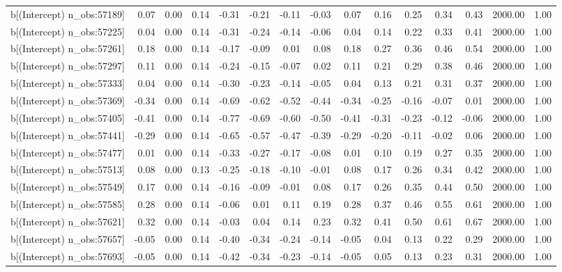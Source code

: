 \begin{table}[ht]
\begin{tabular}{rrrrrrrrrrrrrrr}
  b[(Intercept) n\_obs:57189] & 0.07 & 0.00 & 0.14 & -0.31 & -0.21 & -0.11 & -0.03 & 0.07 & 0.16 & 0.25 & 0.34 & 0.43 & 2000.00 & 1.00 \\ 
  b[(Intercept) n\_obs:57225] & 0.04 & 0.00 & 0.14 & -0.31 & -0.24 & -0.14 & -0.06 & 0.04 & 0.14 & 0.22 & 0.33 & 0.41 & 2000.00 & 1.00 \\ 
  b[(Intercept) n\_obs:57261] & 0.18 & 0.00 & 0.14 & -0.17 & -0.09 & 0.01 & 0.08 & 0.18 & 0.27 & 0.36 & 0.46 & 0.54 & 2000.00 & 1.00 \\ 
  b[(Intercept) n\_obs:57297] & 0.11 & 0.00 & 0.14 & -0.24 & -0.15 & -0.07 & 0.02 & 0.11 & 0.21 & 0.29 & 0.38 & 0.46 & 2000.00 & 1.00 \\ 
  b[(Intercept) n\_obs:57333] & 0.04 & 0.00 & 0.14 & -0.30 & -0.23 & -0.14 & -0.05 & 0.04 & 0.13 & 0.21 & 0.31 & 0.37 & 2000.00 & 1.00 \\ 
  b[(Intercept) n\_obs:57369] & -0.34 & 0.00 & 0.14 & -0.69 & -0.62 & -0.52 & -0.44 & -0.34 & -0.25 & -0.16 & -0.07 & 0.01 & 2000.00 & 1.00 \\ 
  b[(Intercept) n\_obs:57405] & -0.41 & 0.00 & 0.14 & -0.77 & -0.69 & -0.60 & -0.50 & -0.41 & -0.31 & -0.23 & -0.12 & -0.06 & 2000.00 & 1.00 \\ 
  b[(Intercept) n\_obs:57441] & -0.29 & 0.00 & 0.14 & -0.65 & -0.57 & -0.47 & -0.39 & -0.29 & -0.20 & -0.11 & -0.02 & 0.06 & 2000.00 & 1.00 \\ 
  b[(Intercept) n\_obs:57477] & 0.01 & 0.00 & 0.14 & -0.33 & -0.27 & -0.17 & -0.08 & 0.01 & 0.10 & 0.19 & 0.27 & 0.35 & 2000.00 & 1.00 \\ 
  b[(Intercept) n\_obs:57513] & 0.08 & 0.00 & 0.13 & -0.25 & -0.18 & -0.10 & -0.01 & 0.08 & 0.17 & 0.26 & 0.34 & 0.42 & 2000.00 & 1.00 \\ 
  b[(Intercept) n\_obs:57549] & 0.17 & 0.00 & 0.14 & -0.16 & -0.09 & -0.01 & 0.08 & 0.17 & 0.26 & 0.35 & 0.44 & 0.50 & 2000.00 & 1.00 \\ 
  b[(Intercept) n\_obs:57585] & 0.28 & 0.00 & 0.14 & -0.06 & 0.01 & 0.11 & 0.19 & 0.28 & 0.37 & 0.46 & 0.55 & 0.61 & 2000.00 & 1.00 \\ 
  b[(Intercept) n\_obs:57621] & 0.32 & 0.00 & 0.14 & -0.03 & 0.04 & 0.14 & 0.23 & 0.32 & 0.41 & 0.50 & 0.61 & 0.67 & 2000.00 & 1.00 \\ 
  b[(Intercept) n\_obs:57657] & -0.05 & 0.00 & 0.14 & -0.40 & -0.34 & -0.24 & -0.14 & -0.05 & 0.04 & 0.13 & 0.22 & 0.29 & 2000.00 & 1.00 \\ 
  b[(Intercept) n\_obs:57693] & -0.05 & 0.00 & 0.14 & -0.42 & -0.34 & -0.23 & -0.14 & -0.05 & 0.05 & 0.13 & 0.23 & 0.31 & 2000.00 & 1.00 \\ 

\end{tabular}
\end{table}

